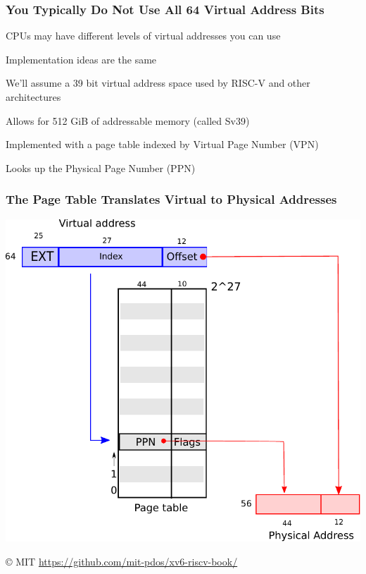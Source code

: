   \begin{frame}
    \frametitle{You Typically Do Not Use All 64 Virtual Address Bits}

    CPUs may have different levels of virtual addresses you can use

    \hspace{2em} Implementation ideas are the same

    \vspace{2em}

    We'll assume a 39 bit virtual address space used by RISC-V and other
    architectures

    \hspace{2em} Allows for 512 GiB of addressable memory (called Sv39)

    \vspace{2em}

    Implemented with a page table indexed by Virtual Page Number (VPN)

    \hspace{2em} Looks up the Physical Page Number (PPN)
  \end{frame}

  \begin{frame}
    \frametitle{The Page Table Translates Virtual to Physical Addresses}

    \begin{center}
      \includegraphics[scale=0.5]{riscv_address.pdf}
    \end{center}

    © MIT \url{https://github.com/mit-pdos/xv6-riscv-book/}
  \end{frame}

